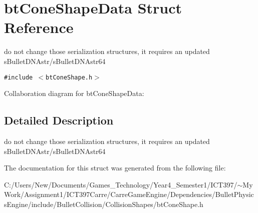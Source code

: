 \hypertarget{structbt_cone_shape_data}{
\section{btConeShapeData Struct Reference}
\label{structbt_cone_shape_data}
}
do not change those serialization structures, it requires an updated sBulletDNAstr/sBulletDNAstr64  


{\tt \#include $<$btConeShape.h$>$}

Collaboration diagram for btConeShapeData:

\subsection{Detailed Description}
do not change those serialization structures, it requires an updated sBulletDNAstr/sBulletDNAstr64 

The documentation for this struct was generated from the following file:\begin{CompactItemize}
\item 
C:/Users/New/Documents/Games\_\-Technology/Year4\_\-Semester1/ICT397/$\sim$My Work/Assignment1/ICT397Carre/CarreGameEngine/Dependencies/BulletPhysicsEngine/include/BulletCollision/CollisionShapes/btConeShape.h\end{CompactItemize}

